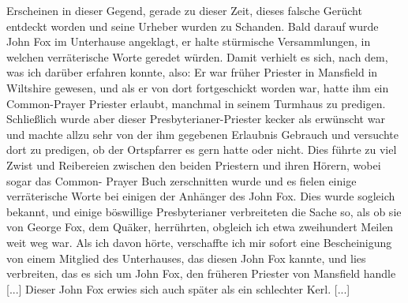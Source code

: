 Erscheinen in dieser Gegend, gerade zu dieser Zeit, dieses falsche
Gerücht entdeckt worden und seine Urheber wurden zu Schanden.
Bald darauf wurde John Fox im Unterhause angeklagt, er
halte stürmische Versammlungen, in welchen verräterische Worte
geredet würden. Damit verhielt es sich, nach dem, was ich darüber
erfahren konnte, also: Er war früher Priester in Mansfield in
Wiltshire gewesen, und als er von dort fortgeschickt worden war,
hatte ihm ein Common-Prayer Priester erlaubt, manchmal in
seinem Turmhaus zu predigen. Schließlich wurde aber dieser
Presbyterianer-Priester kecker als erwünscht war und machte
allzu sehr von der ihm gegebenen Erlaubnis Gebrauch und 
versuchte dort zu predigen, ob der Ortspfarrer es gern hatte oder
nicht. Dies führte zu viel Zwist und Reibereien zwischen den
beiden Priestern und ihren Hörern, wobei sogar das Common-
Prayer Buch zerschnitten wurde und es fielen einige verräterische
Worte bei einigen der Anhänger des John Fox. Dies wurde
sogleich bekannt, und einige böswillige Presbyterianer verbreiteten
die Sache so, als ob sie von George Fox, dem Quäker, herrührten,
obgleich ich etwa zweihundert Meilen weit weg war. Als ich
davon hörte, verschaffte ich mir sofort eine Bescheinigung von
einem Mitglied des Unterhauses, das diesen John Fox kannte,
und lies verbreiten, das es sich um John Fox, den früheren
Priester von Mansfield handle [...] Dieser John Fox erwies
sich auch später als ein schlechter Kerl. [...]

